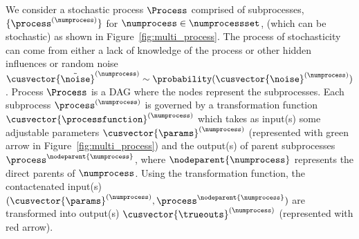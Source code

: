 We consider a stochastic process $\Process$ comprised of subprocesses, $\{\process^{(\numprocess)}\}$ for $\numprocess\in\numprocessset$, (which can be stochastic) as shown in Figure~\ref{fig:multi_process}. The process of stochasticity can come from either a lack of knowledge of the process or other hidden influences or random noise $\cusvector{\tilde{\noise}}^{(\numprocess)}\sim\probability(\cusvector{\noise}^{(\numprocess)})$. Process $\Process$ is a DAG where the nodes represent the subprocesses. Each subprocess $\process^{(\numprocess)}$ is governed by a transformation function $\cusvector{\processfunction}^{(\numprocess)}$ which takes as input(s) some adjustable parameters $\cusvector{\params}^{(\numprocess)}$ (represented with green arrow in Figure~\ref{fig:multi_process}) and the output(s) of parent subprocesses $\process^{\nodeparent{\numprocess}}$, where $\nodeparent{\numprocess}$ represents the direct parents of $\numprocess$. Using the transformation function, the contactenated input(s) $(\cusvector{\params}^{(\numprocess)}, \process^{\nodeparent{\numprocess}})$ are transformed into output(s) $\cusvector{\trueouts}^{(\numprocess)}$ (represented with red arrow).

